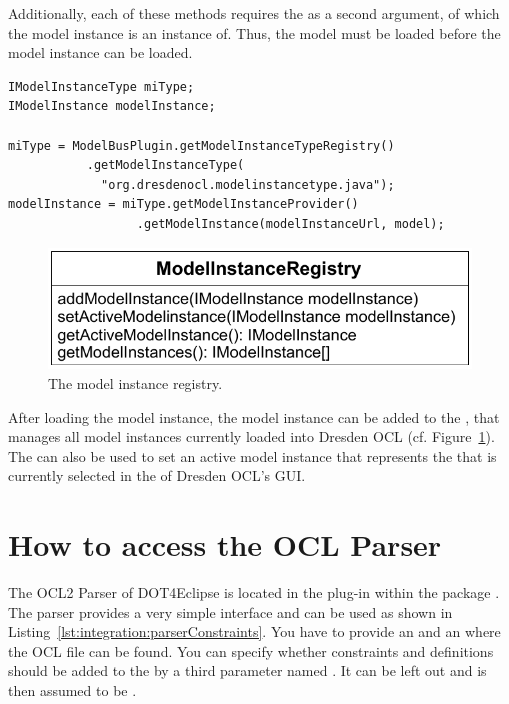Additionally, each of these methods requires the  as a second
argument, of which the model instance is an instance of. Thus, the model must be
loaded before the model instance can be loaded.

\lstset{
  language=Java
}
\begin{lstlisting}[caption={How to load a model instance.}, captionpos=b, label=lst:integration:loadModelInstance, float]
IModelInstanceType miType;
IModelInstance modelInstance;

miType = ModelBusPlugin.getModelInstanceTypeRegistry()
           .getModelInstanceType(
             "org.dresdenocl.modelinstancetype.java");
modelInstance = miType.getModelInstanceProvider()
                  .getModelInstance(modelInstanceUrl, model);
\end{lstlisting}

\begin{figure}[!b]
	\centering
	\includegraphics[width=.75\linewidth]{figures/integration/modelInstanceRegistry}
	\caption{The model instance registry.}
	\label{pic:integration:modelInstanceRegistry}
\end{figure}

After loading the model instance, the model instance can be added to the
, that manages all model instances
currently loaded into Dresden OCL (cf.
Figure~\ref{pic:integration:modelInstanceRegistry}). The
 can also be used to set an active model instance
that represents the  that is currently selected in the
 of Dresden OCL's GUI.



\section{How to access the OCL Parser}

The OCL2 Parser of \acl{DOT4Eclipse} is located in the plug-in 
 within the
package . The parser provides a
very simple interface and can be used as shown in
Listing~\ref{lst:integration:parserConstraints}. You have to provide an
 and an  where the OCL file can be found. You can specify
whether constraints and definitions should be added to the  by a
third parameter named . It can be left out and is then assumed
to be .


